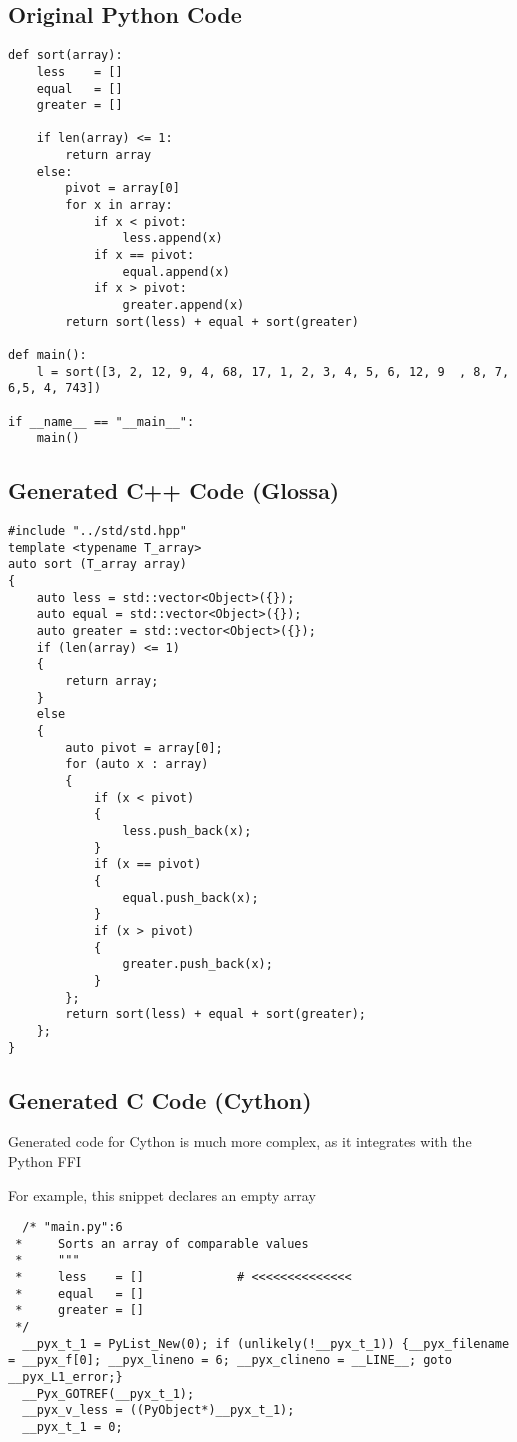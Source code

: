 \documentclass{article}
\begin{document}
\newpage
\subsection{Original Python Code}

\lstset{language=Python}
\begin{lstlisting}
def sort(array):
    less    = []
    equal   = []
    greater = []

    if len(array) <= 1:
        return array
    else:
        pivot = array[0]
        for x in array:
            if x < pivot:
                less.append(x)
            if x == pivot:
                equal.append(x)
            if x > pivot:
                greater.append(x)
        return sort(less) + equal + sort(greater)

def main():
    l = sort([3, 2, 12, 9, 4, 68, 17, 1, 2, 3, 4, 5, 6, 12, 9  , 8, 7, 6,5, 4, 743])

if __name__ == "__main__":
    main()
\end{lstlisting}

\lstset{language=C}

\newpage
\subsection{Generated C++ Code (Glossa)}

\begin{lstlisting}
#include "../std/std.hpp"
template <typename T_array>
auto sort (T_array array)
{
    auto less = std::vector<Object>({});
    auto equal = std::vector<Object>({});
    auto greater = std::vector<Object>({});
    if (len(array) <= 1)
    {
        return array;
    }
    else
    {
        auto pivot = array[0];
        for (auto x : array)
        {
            if (x < pivot)
            {
                less.push_back(x);
            }
            if (x == pivot)
            {
                equal.push_back(x);
            }
            if (x > pivot)
            {
                greater.push_back(x);
            }
        };
        return sort(less) + equal + sort(greater);
    };
}
\end{lstlisting}

\newpage
\subsection{Generated C Code (Cython)}

Generated code for Cython is much more complex, as it integrates with the Python FFI

For example, this snippet declares an empty array

\begin{lstlisting}
  /* "main.py":6
 *     Sorts an array of comparable values
 *     """
 *     less    = []             # <<<<<<<<<<<<<<
 *     equal   = []
 *     greater = []
 */
  __pyx_t_1 = PyList_New(0); if (unlikely(!__pyx_t_1)) {__pyx_filename = __pyx_f[0]; __pyx_lineno = 6; __pyx_clineno = __LINE__; goto __pyx_L1_error;}
  __Pyx_GOTREF(__pyx_t_1);
  __pyx_v_less = ((PyObject*)__pyx_t_1);
  __pyx_t_1 = 0;
\end{lstlisting}

\newpage
\end{document}
